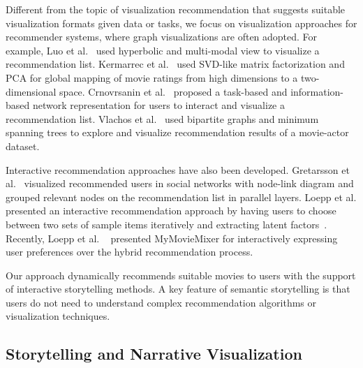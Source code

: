 \documentclass{vgtc}                          %
\begin{document}
Different from the topic of visualization recommendation that suggests suitable visualization formats given data or tasks, we focus on visualization approaches for recommender systems, where graph visualizations are often adopted.
For example, 
Luo et al.~\cite{luo2009personalized} used hyperbolic and multi-modal view to visualize a recommendation list. 
Kermarrec et al.~\cite{kermarrec2012data} used SVD-like matrix factorization and PCA for global mapping of movie ratings from high dimensions to a two-dimensional space. 
Crnovrsanin et al.~\cite{crnovrsanin2011visual} proposed a 
task-based and information-based network representation for users to 
interact and visualize a recommendation list. 
%
Vlachos et al.~\cite{vlachos2012recommendation} used bipartite graphs and minimum spanning trees to explore and visualize recommendation results of a movie-actor dataset. 

Interactive recommendation approaches have also been developed.
Gretarsson et al.~\cite{gretarsson2010smallworlds} visualized recommended users in social networks with node-link diagram and grouped relevant nodes on 
the recommendation list in parallel layers. 
Loepp et al. presented an interactive recommendation approach by having users to choose between two sets of sample items iteratively and extracting latent factors~\cite{loepp2014choice}.
Recently, Loepp et al. ~\cite{loepp2015blended} presented MyMovieMixer for interactively expressing user preferences over the hybrid recommendation process.

Our approach dynamically recommends suitable movies to users with the support of interactive storytelling methods.
A key feature of semantic storytelling is that users do not need to understand complex recommendation algorithms or visualization techniques.

 

\subsection{Storytelling and Narrative Visualization} 
\end{document}
